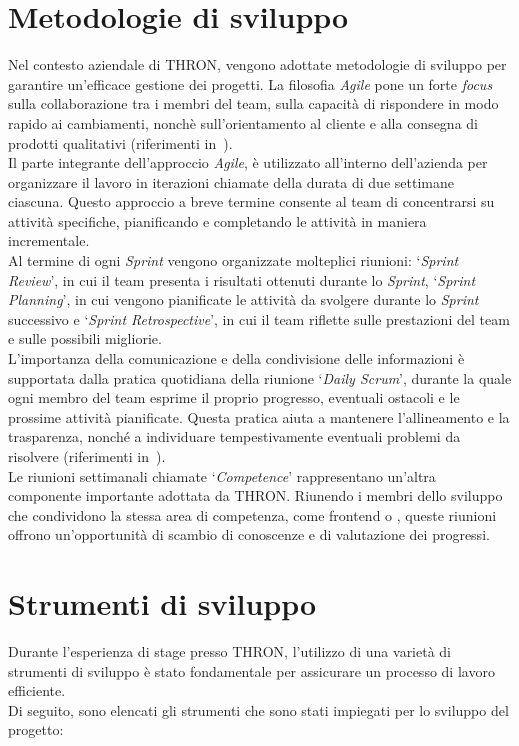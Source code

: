 \section{Metodologie di sviluppo}\label{sec:metodologie-sviluppo}
Nel contesto aziendale di THRON, vengono adottate metodologie di sviluppo  per garantire un'efficace
gestione dei progetti. La filosofia \textit{Agile} pone un forte \textit{focus} sulla collaborazione tra i membri del team,
sulla capacità di rispondere in modo rapido ai cambiamenti, nonchè sull'orientamento al cliente e alla consegna di prodotti qualitativi (riferimenti in~\cite{site:agile-manifesto}).\\
Il    parte integrante dell'approccio \textit{Agile}, è utilizzato all'interno dell'azienda per organizzare il lavoro in iterazioni chiamate
 della durata di due settimane ciascuna. Questo approccio a breve termine consente al team di concentrarsi su attività specifiche, pianificando
e completando le attività in maniera incrementale.\\
Al termine di ogni \textit{Sprint} vengono organizzate molteplici riunioni: `\textit{Sprint Review}', in cui il team presenta i risultati ottenuti durante lo \textit{Sprint},
`\textit{Sprint Planning}', in cui vengono pianificate le attività da svolgere durante lo \textit{Sprint} successivo e `\textit{Sprint Retrospective}', in cui il team riflette sulle prestazioni del team e sulle possibili migliorie.\\
L'importanza della comunicazione e della condivisione delle informazioni è supportata dalla pratica quotidiana della riunione `\textit{Daily Scrum}', durante la quale
ogni membro del team esprime il proprio progresso, eventuali ostacoli e le prossime attività pianificate. Questa pratica aiuta a mantenere l'allineamento e
la trasparenza, nonché a individuare tempestivamente eventuali problemi da risolvere (riferimenti in~\cite{site:scrum}).\\
Le riunioni settimanali chiamate `\textit{Competence}' rappresentano un'altra componente importante adottata da THRON. Riunendo i membri dello sviluppo 
che condividono la stessa area di competenza, come frontend o , queste riunioni offrono un'opportunità di scambio di conoscenze e di valutazione dei progressi.
\section{Strumenti di sviluppo}\label{sec:strumenti-sviluppo}
Durante l'esperienza di stage presso THRON, l'utilizzo di una varietà di strumenti di sviluppo è stato fondamentale per assicurare un processo di lavoro efficiente.\\
Di seguito, sono elencati gli strumenti che sono stati impiegati per lo sviluppo del progetto:

